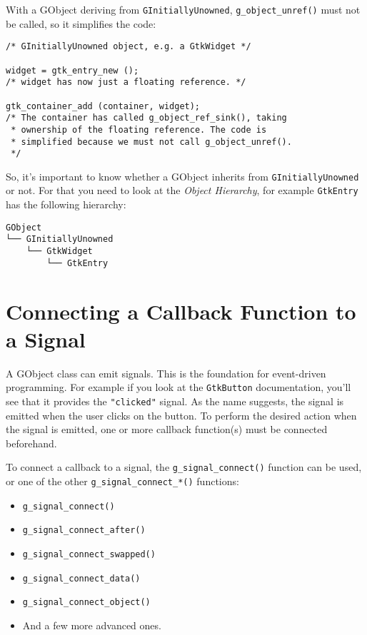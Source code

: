 With a GObject deriving from \lstinline{GInitiallyUnowned}, \lstinline{g_object_unref()} must not be called, so it simplifies the code:
\begin{lstlisting}
/* GInitiallyUnowned object, e.g. a GtkWidget */

widget = gtk_entry_new ();
/* widget has now just a floating reference. */

gtk_container_add (container, widget);
/* The container has called g_object_ref_sink(), taking
 * ownership of the floating reference. The code is
 * simplified because we must not call g_object_unref().
 */
\end{lstlisting}

So, it's important to know whether a GObject inherits from \lstinline{GInitiallyUnowned} or not. For that you need to look at the \emph{Object Hierarchy}, for example \lstinline{GtkEntry} has the following hierarchy:

\begin{verbatim}
GObject
└── GInitiallyUnowned
    └── GtkWidget
        └── GtkEntry
\end{verbatim}

\section{Connecting a Callback Function to a Signal}

A GObject class can emit signals. This is the foundation for event-driven programming. For example if you look at the \lstinline{GtkButton} documentation, you'll see that it provides the \lstinline{"clicked"} signal. As the name suggests, the signal is emitted when the user clicks on the button. To perform the desired action when the signal is emitted, one or more callback function(s) must be connected beforehand.

To connect a callback to a signal, the \lstinline{g_signal_connect()} function can be used, or one of the other \lstinline{g_signal_connect_*()} functions:
\begin{itemize}
  \item \lstinline{g_signal_connect()}
  \item \lstinline{g_signal_connect_after()}
  \item \lstinline{g_signal_connect_swapped()}
  \item \lstinline{g_signal_connect_data()}
  \item \lstinline{g_signal_connect_object()}
  \item And a few more advanced ones.
\end{itemize}

